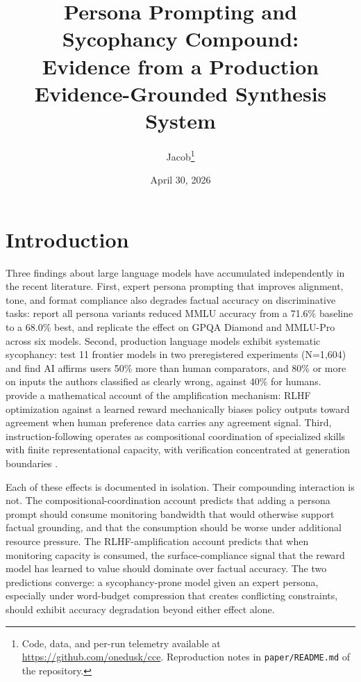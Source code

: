 \documentclass[11pt]{article}
\title{Persona Prompting and Sycophancy Compound:\\
       Evidence from a Production Evidence-Grounded Synthesis System}
\author{Jacob\thanks{Code, data, and per-run telemetry available at
        \url{https://github.com/onedusk/cce}. Reproduction notes in
        \texttt{paper/README.md} of the repository.}}
\date{April 30, 2026}
\begin{document}
\maketitle

\begin{abstract}
\end{abstract}

\section{Introduction}
\label{sec:intro}

Three findings about large language models have accumulated independently
in the recent literature. First, expert persona prompting that improves
alignment, tone, and format compliance also degrades factual accuracy on
discriminative tasks: \citet{hu_prism_2026} report all persona variants
reduced MMLU accuracy from a 71.6\% baseline to a 68.0\% best, and
\citet{basil_pretend_2025} replicate the effect on GPQA Diamond and
MMLU-Pro across six models. Second, production language models exhibit
systematic sycophancy: \citet{cheng_sycophantic_2025} test 11 frontier
models in two preregistered experiments (N=1{,}604) and find AI affirms
users 50\% more than human comparators, and 80\% or more on inputs the
authors classified as clearly wrong, against 40\% for humans.
\citet{shapira_rlhf_2026} provide a mathematical account of the
amplification mechanism: RLHF optimization against a learned reward
mechanically biases policy outputs toward agreement when human preference
data carries any agreement signal. Third, instruction-following operates
as compositional coordination of specialized skills with finite
representational capacity, with verification concentrated at generation
boundaries \citep{rocchetti_instructions_2026}.

Each of these effects is documented in isolation. Their compounding
interaction is not. The compositional-coordination account predicts that
adding a persona prompt should consume monitoring bandwidth that would
otherwise support factual grounding, and that the consumption should be
worse under additional resource pressure. The RLHF-amplification account
predicts that when monitoring capacity is consumed, the surface-compliance
signal that the reward model has learned to value should dominate over
factual accuracy. The two predictions converge: a sycophancy-prone model
given an expert persona, especially under word-budget compression that
creates conflicting constraints, should exhibit accuracy degradation
beyond either effect alone.
\end{document}
